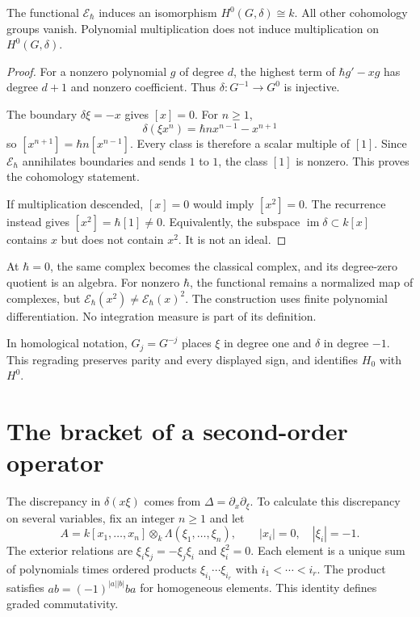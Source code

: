 \begin{proposition}\label{prop:gaussian-cohomology}
The functional $\mathcal E_\hbar$ induces an isomorphism
$H^0(G,\delta)\cong k$. All other cohomology groups vanish.
Polynomial multiplication does not induce multiplication on
$H^0(G,\delta)$.
\end{proposition}

\begin{proof}
For a nonzero polynomial $g$ of degree $d$, the highest term of
$\hbar g'-xg$ has degree $d+1$ and nonzero coefficient.
Thus $\delta:G^{-1}\to G^0$ is injective.

The boundary $\delta\xi=-x$ gives $[x]=0$.
For $n\geq1$,
\[
 \delta(\xi x^n)=\hbar n x^{n-1}-x^{n+1}
\]
so $[x^{n+1}]=\hbar n[x^{n-1}]$.
Every class is therefore a scalar multiple of $[1]$.
Since $\mathcal E_\hbar$ annihilates boundaries and sends $1$ to $1$,
the class $[1]$ is nonzero. This proves the cohomology statement.

If multiplication descended, $[x]=0$ would imply $[x^2]=0$.
The recurrence instead gives $[x^2]=\hbar[1]\ne0$.
Equivalently, the subspace $\operatorname{im}\delta\subset k[x]$
contains $x$ but does not contain $x^2$.
It is not an ideal.
\end{proof}

At $\hbar=0$, the same complex becomes the classical complex, and
its degree-zero quotient is an algebra.
For nonzero $\hbar$, the functional remains a normalized map of complexes,
but $\mathcal E_\hbar(x^2)\ne\mathcal E_\hbar(x)^2$.
The construction uses finite polynomial differentiation.
No integration measure is part of its definition.

In homological notation, $G_j=G^{-j}$ places $\xi$ in degree one
and $\delta$ in degree $-1$.
This regrading preserves parity and every displayed sign, and
identifies $H_0$ with $H^0$.

\section{The bracket of a second-order operator}
\label{sec:gaussian-bv-algebra}

The discrepancy in $\delta(x\xi)$ comes from
$\Delta=\partial_x\partial_\xi$.
To calculate this discrepancy on several variables, fix an integer
$n\geq1$ and let
\[
 A=k[x_1,\ldots,x_n]\otimes_k\Lambda(\xi_1,\ldots,\xi_n),
 \qquad |x_i|=0,\quad |\xi_i|=-1.
\]
The exterior relations are
$\xi_i\xi_j=-\xi_j\xi_i$ and $\xi_i^2=0$.
Each element is a unique sum of polynomials times ordered products
$\xi_{i_1}\cdots\xi_{i_r}$ with $i_1<\cdots<i_r$.
The product satisfies $ab=(-1)^{|a||b|}ba$ for homogeneous elements.
This identity defines graded commutativity.

